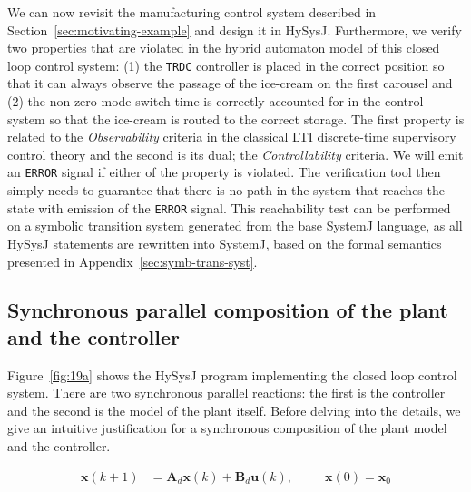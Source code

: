 \documentclass[10pt,journal,cspaper,compsoc]{IEEEtran}
\begin{document}
We can now revisit the manufacturing control system described in
Section~\ref{sec:motivating-example} and design it in
HySysJ. Furthermore, we verify two properties that are violated in the
hybrid automaton model of this closed loop control system: (1) the
\texttt{TRDC} controller is placed in the correct position so that it
can always observe the passage of the ice-cream on the first carousel
and (2) the non-zero mode-switch time is correctly accounted for in the
control system so that the ice-cream is routed to the correct
storage. The first property is related to the \textit{Observability}
criteria in the classical LTI discrete-time supervisory control theory
and the second is its dual; the \textit{Controllability} criteria. We
will emit an \texttt{ERROR} signal if either of the property is
violated. The verification tool then simply needs to guarantee that
there is no path in the system that reaches the state with emission of
the \texttt{ERROR} signal. This reachability test can be performed on a
symbolic transition system generated from the base SystemJ language, as
all HySysJ statements are rewritten into SystemJ, based on the formal
semantics presented in Appendix~\ref{sec:symb-trans-syst}.

\subsection{Synchronous parallel composition of the plant and the controller}
\label{sec:synchr-parall-comp}

Figure~\ref{fig:19a} shows the HySysJ program implementing the closed
loop control system. There are two synchronous parallel reactions: the
first is the controller and the second is the model of the plant
itself. Before delving into the details, we give an intuitive
justification for a synchronous composition of the plant model and the
controller.

\begin{align}
  \mathbf{x}(k + 1) & = \mathbf{A}_d\mathbf{x}(k) + \mathbf{B}_d
  \mathbf{u}(k), \hspace{30pt} \mathbf{x}(0) = \mathbf{x}_0
   \label{eq:6}
\end{align}
\end{document}

